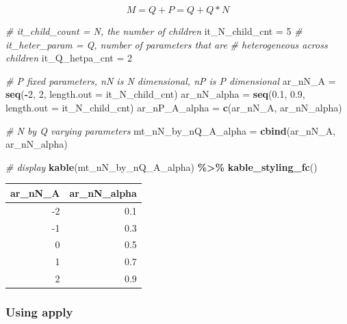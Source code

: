 \documentclass[
]{book}
\newenvironment{Shaded}{\begin{snugshade}}{\end{snugshade}}
\newcommand{\CommentTok}[1]{\textcolor[rgb]{0.56,0.35,0.01}{\textit{#1}}}
\newcommand{\DataTypeTok}[1]{\textcolor[rgb]{0.13,0.29,0.53}{#1}}
\newcommand{\DecValTok}[1]{\textcolor[rgb]{0.00,0.00,0.81}{#1}}
\newcommand{\FloatTok}[1]{\textcolor[rgb]{0.00,0.00,0.81}{#1}}
\newcommand{\KeywordTok}[1]{\textcolor[rgb]{0.13,0.29,0.53}{\textbf{#1}}}
\newcommand{\NormalTok}[1]{#1}
\newcommand{\OperatorTok}[1]{\textcolor[rgb]{0.81,0.36,0.00}{\textbf{#1}}}
\newcommand{\StringTok}[1]{\textcolor[rgb]{0.31,0.60,0.02}{#1}}
\begin{document}
\[M = Q+P = Q + Q*N\]

\begin{Shaded}
\begin{Highlighting}[]
\CommentTok{\# it\_child\_count = N, the number of children}
\NormalTok{it\_N\_child\_cnt =}\StringTok{ }\DecValTok{5}
\CommentTok{\# it\_heter\_param = Q, number of parameters that are}
\CommentTok{\# heterogeneous across children}
\NormalTok{it\_Q\_hetpa\_cnt =}\StringTok{ }\DecValTok{2}

\CommentTok{\# P fixed parameters, nN is N dimensional, nP is P dimensional}
\NormalTok{ar\_nN\_A =}\StringTok{ }\KeywordTok{seq}\NormalTok{(}\OperatorTok{{-}}\DecValTok{2}\NormalTok{, }\DecValTok{2}\NormalTok{, }\DataTypeTok{length.out =}\NormalTok{ it\_N\_child\_cnt)}
\NormalTok{ar\_nN\_alpha =}\StringTok{ }\KeywordTok{seq}\NormalTok{(}\FloatTok{0.1}\NormalTok{, }\FloatTok{0.9}\NormalTok{, }\DataTypeTok{length.out =}\NormalTok{ it\_N\_child\_cnt)}
\NormalTok{ar\_nP\_A\_alpha =}\StringTok{ }\KeywordTok{c}\NormalTok{(ar\_nN\_A, ar\_nN\_alpha)}

\CommentTok{\# N by Q varying parameters}
\NormalTok{mt\_nN\_by\_nQ\_A\_alpha =}\StringTok{ }\KeywordTok{cbind}\NormalTok{(ar\_nN\_A, ar\_nN\_alpha)}

\CommentTok{\# display}
\KeywordTok{kable}\NormalTok{(mt\_nN\_by\_nQ\_A\_alpha) }\OperatorTok{\%\textgreater{}\%}
\StringTok{  }\KeywordTok{kable\_styling\_fc}\NormalTok{()}
\end{Highlighting}
\end{Shaded}

\begin{table}[!h]
\centering
\begin{tabular}{r|r}
\hline
ar\_nN\_A & ar\_nN\_alpha\\
\hline
\rowcolor{gray!6}  -2 & 0.1\\
\hline
-1 & 0.3\\
\hline
\rowcolor{gray!6}  0 & 0.5\\
\hline
1 & 0.7\\
\hline
\rowcolor{gray!6}  2 & 0.9\\
\hline
\end{tabular}
\end{table}

\hypertarget{using-apply}{%
\subsubsection{Using apply}\label{using-apply}}
\end{document}
